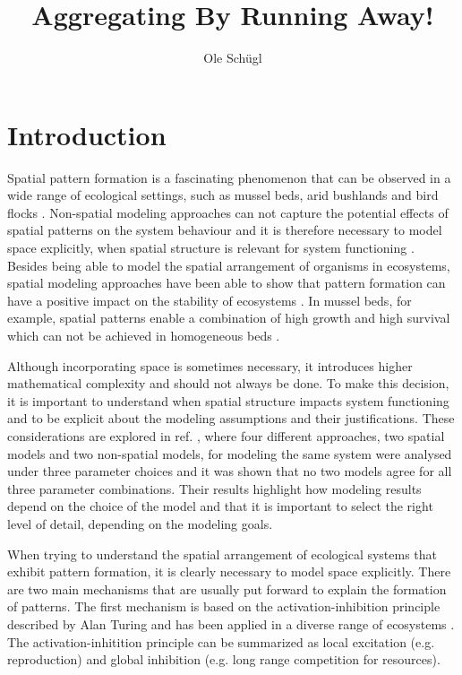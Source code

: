 \documentclass{article}
\title{Aggregating By Running Away!}
\author{Ole Schügl}
\begin{document}
 
\maketitle

\section{Introduction}
Spatial pattern formation is a fascinating phenomenon that can be observed in a wide range of ecological settings, such as mussel beds, arid bushlands and bird flocks \autocite{liuPhaseSeparationDriven2016,rietkerkSelfOrganizationVegetationArid}.
Non-spatial modeling approaches can not capture the potential effects of spatial patterns on the system behaviour and it is therefore necessary to model space explicitly, when spatial structure is relevant for system functioning \cite{durrettImportanceBeingDiscrete1994}.
Besides being able to model the spatial arrangement of organisms in ecosystems, spatial modeling approaches have been able to show that pattern formation can have a positive impact on the stability of ecosystems \cite{durrettImportanceBeingDiscrete1994, vandekoppelExperimentalEvidenceSpatial2008,rietkerkEvasionTippingComplex2021,liuPatternFormationMultiple2014}. 
In mussel beds, for example, spatial patterns enable a combination of high growth and high survival which can not be achieved in homogeneous beds \autocite{vandekoppelExperimentalEvidenceSpatial2008}.

Although incorporating space is sometimes necessary, it introduces higher mathematical complexity and should not always be done.
To make this decision, it is important to understand when spatial structure impacts system functioning and to be explicit about the modeling assumptions and their justifications.
These considerations are explored in ref. \cite{durrettImportanceBeingDiscrete1994}, where four different approaches, two spatial models and two non-spatial models, for modeling the same system were analysed under three parameter choices and it was shown that no two models agree for all three parameter combinations.
Their results highlight how modeling results depend on the choice of the model and that it is important to select the right level of detail, depending on the modeling goals.

When trying to understand the spatial arrangement of ecological systems that exhibit pattern formation, it is clearly necessary to model space explicitly.
There are two main mechanisms that are usually put forward to explain the formation of patterns.
The first mechanism is based on the activation-inhibition principle described by Alan Turing \autocite{turingChemicalBasisMorphogenesis1952} and has been applied in a diverse range of ecosystems \autocite{rietkerkRegularPatternFormation2008}.
The activation-inhitition principle can be summarized as local excitation (e.g. reproduction) and global inhibition (e.g. long range competition for resources).
\end{document}
